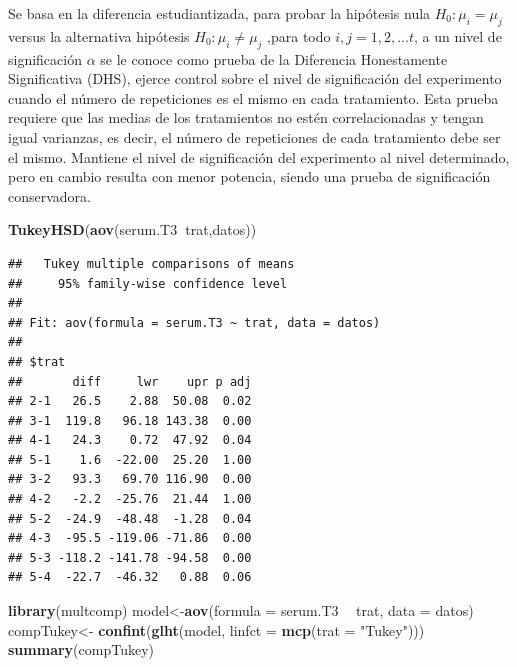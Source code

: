 \documentclass[]{book}
\newenvironment{Shaded}{\begin{snugshade}}{\end{snugshade}}
\newcommand{\KeywordTok}[1]{\textcolor[rgb]{0.13,0.29,0.53}{\textbf{#1}}}
\newcommand{\DataTypeTok}[1]{\textcolor[rgb]{0.13,0.29,0.53}{#1}}
\newcommand{\StringTok}[1]{\textcolor[rgb]{0.31,0.60,0.02}{#1}}
\newcommand{\OperatorTok}[1]{\textcolor[rgb]{0.81,0.36,0.00}{\textbf{#1}}}
\newcommand{\NormalTok}[1]{#1}
\begin{document}
Se basa en la diferencia estudiantizada, para probar la hipótesis nula
\(H_0:\mu_i=\mu_j\) versus la alternativa hipótesis
\(H_0:\mu_i\neq\mu_j\) ,para todo \(i,j=1,2,...t\), a un nivel de
significación \(\alpha\) se le conoce como prueba de la Diferencia
Honestamente Significativa (DHS), ejerce control sobre el nivel de
significación del experimento cuando el número de repeticiones es el
mismo en cada tratamiento. Esta prueba requiere que las medias de los
tratamientos no estén correlacionadas y tengan igual varianzas, es
decir, el número de repeticiones de cada tratamiento debe ser el mismo.
Mantiene el nivel de significación del experimento al nivel determinado,
pero en cambio resulta con menor potencia, siendo una prueba de
significación conservadora.

\begin{Shaded}
\begin{Highlighting}[]
\KeywordTok{TukeyHSD}\NormalTok{(}\KeywordTok{aov}\NormalTok{(serum.T3}\OperatorTok{~}\NormalTok{trat,datos))}
\end{Highlighting}
\end{Shaded}

\begin{verbatim}
##   Tukey multiple comparisons of means
##     95% family-wise confidence level
## 
## Fit: aov(formula = serum.T3 ~ trat, data = datos)
## 
## $trat
##       diff     lwr    upr p adj
## 2-1   26.5    2.88  50.08  0.02
## 3-1  119.8   96.18 143.38  0.00
## 4-1   24.3    0.72  47.92  0.04
## 5-1    1.6  -22.00  25.20  1.00
## 3-2   93.3   69.70 116.90  0.00
## 4-2   -2.2  -25.76  21.44  1.00
## 5-2  -24.9  -48.48  -1.28  0.04
## 4-3  -95.5 -119.06 -71.86  0.00
## 5-3 -118.2 -141.78 -94.58  0.00
## 5-4  -22.7  -46.32   0.88  0.06
\end{verbatim}

\begin{Shaded}
\begin{Highlighting}[]
\KeywordTok{library}\NormalTok{(multcomp)}
\NormalTok{model<-}\KeywordTok{aov}\NormalTok{(}\DataTypeTok{formula =}\NormalTok{ serum.T3 }\OperatorTok{~}\StringTok{ }\NormalTok{trat, }\DataTypeTok{data =}\NormalTok{ datos)}
\NormalTok{compTukey<-}\StringTok{ }\KeywordTok{confint}\NormalTok{(}\KeywordTok{glht}\NormalTok{(model, }\DataTypeTok{linfct =} \KeywordTok{mcp}\NormalTok{(}\DataTypeTok{trat =} \StringTok{"Tukey"}\NormalTok{)))}
\KeywordTok{summary}\NormalTok{(compTukey)}
\end{Highlighting}
\end{Shaded}
\end{document}
